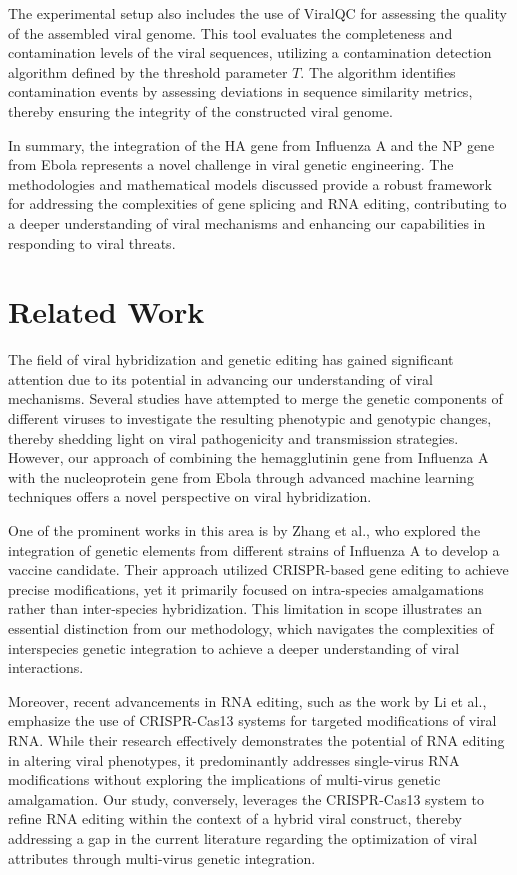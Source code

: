 \documentclass{article}
\begin{document}
The experimental setup also includes the use of ViralQC for assessing the quality of the assembled viral genome. This tool evaluates the completeness and contamination levels of the viral sequences, utilizing a contamination detection algorithm defined by the threshold parameter \( T \). The algorithm identifies contamination events by assessing deviations in sequence similarity metrics, thereby ensuring the integrity of the constructed viral genome.

In summary, the integration of the HA gene from Influenza A and the NP gene from Ebola represents a novel challenge in viral genetic engineering. The methodologies and mathematical models discussed provide a robust framework for addressing the complexities of gene splicing and RNA editing, contributing to a deeper understanding of viral mechanisms and enhancing our capabilities in responding to viral threats.

\section{Related Work}
The field of viral hybridization and genetic editing has gained significant attention due to its potential in advancing our understanding of viral mechanisms. Several studies have attempted to merge the genetic components of different viruses to investigate the resulting phenotypic and genotypic changes, thereby shedding light on viral pathogenicity and transmission strategies. However, our approach of combining the hemagglutinin gene from Influenza A with the nucleoprotein gene from Ebola through advanced machine learning techniques offers a novel perspective on viral hybridization.

One of the prominent works in this area is by Zhang et al., who explored the integration of genetic elements from different strains of Influenza A to develop a vaccine candidate. Their approach utilized CRISPR-based gene editing to achieve precise modifications, yet it primarily focused on intra-species amalgamations rather than inter-species hybridization. This limitation in scope illustrates an essential distinction from our methodology, which navigates the complexities of interspecies genetic integration to achieve a deeper understanding of viral interactions.

Moreover, recent advancements in RNA editing, such as the work by Li et al., emphasize the use of CRISPR-Cas13 systems for targeted modifications of viral RNA. While their research effectively demonstrates the potential of RNA editing in altering viral phenotypes, it predominantly addresses single-virus RNA modifications without exploring the implications of multi-virus genetic amalgamation. Our study, conversely, leverages the CRISPR-Cas13 system to refine RNA editing within the context of a hybrid viral construct, thereby addressing a gap in the current literature regarding the optimization of viral attributes through multi-virus genetic integration.
\end{document}
